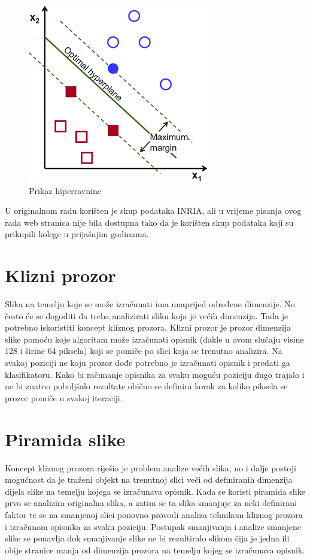 \documentclass[times, utf8, zavrsni]{fer}
\begin{document}
\begin{figure}[htb]
	\centering
	\includegraphics[width=0.5\linewidth]{figures/optimal-hyperplane.png}
	\caption{Prikaz hiperravnine\protect\footnotemark}
	\label{fig:hyperplane}
\end{figure}


U originalnom radu \cite{dalal2005histograms} korišten je skup podataka INRIA\protect\footnotemark, ali u vrijeme pisanja ovog rada web stranica nije bila dostupna tako da je korišten skup podataka koji su prikupili kolege u prijašnjim godinama.


\section{Klizni prozor}
Slika na temelju koje se može izračunati ima unaprijed određene dimenzije. No često će se dogoditi da treba analizirati sliku koja je većih dimenzija. Tada je potrebno iskoristiti koncept kliznog prozora. Klizni prozor je prozor dimenzija slike pomoću koje algoritam može izračunati opisnik (dakle u ovom slučaju visine 128 i širine 64 piksela) koji se pomiče po slici koja se trenutno analizira. Na svakoj poziciji ne koju prozor dođe potrebno je izračunati opisnik i predati ga klasifikatoru. Kako bi računanje opisnika za svaku moguću poziciju dugo trajalo i ne bi znatno poboljšalo rezultate obično se definira korak za koliko piksela se prozor pomiče u svakoj iteraciji.

\section{Piramida slike}
Koncept kliznog prozora riješio je problem analize većih slika, no i dalje postoji mogućnost da je traženi objekt na trenutnoj slici veći od definiranih dimenzija dijela slike na temelju kojega se izračunava opisnik. Kada se koristi piramida slike prvo se analizira originalna slika, a zatim se ta slika smanjuje za neki definirani faktor te se na smanjenoj slici ponovno provodi analiza tehnikom kliznog prozora i izračunom opisnika za svaku poziciju. Postupak smanjivanja i analize smanjene slike se ponavlja dok smanjivanje slike ne bi rezultiralo slikom čija je jedna ili obije stranice manja od dimenzija prozora na temelju kojeg se izračunava opisnik.
\end{document}
